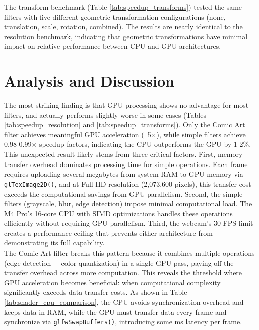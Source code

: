 \documentclass[12pt,a4paper]{article}
\begin{document}
The transform benchmark (Table \ref{tab:speedup_transforms}) tested the same filters with five different geometric transformation configurations (none, translation, scale, rotation, combined). The results are nearly identical to the resolution benchmark, indicating that geometric transformations have minimal impact on relative performance between CPU and GPU architectures.

\section{Analysis and Discussion}
The most striking finding is that GPU processing shows no advantage for most filters, and actually performs slightly worse in some cases (Tables \ref{tab:speedup_resolution} and \ref{tab:speedup_transforms}). Only the Comic Art filter achieves meaningful GPU acceleration (~5×), while simple filters achieve 0.98-0.99× speedup factors, indicating the CPU outperforms the GPU by 1-2\%.
\\
This unexpected result likely stems from three critical factors. First, memory transfer overhead dominates processing time for simple operations. Each frame requires uploading several megabytes from system RAM to GPU memory via \texttt{glTexImage2D()}, and at Full HD resolution (2,073,600 pixels), this transfer cost exceeds the computational savings from GPU parallelism. Second, the simple filters (grayscale, blur, edge detection) impose minimal computational load. The M4 Pro's 16-core CPU with SIMD optimizations handles these operations efficiently without requiring GPU parallelism. Third, the webcam's 30 FPS limit creates a performance ceiling that prevents either architecture from demonstrating its full capability.
\\
The Comic Art filter breaks this pattern because it combines multiple operations (edge detection + color quantization) in a single GPU pass, paying off the transfer overhead across more computation. This reveals the threshold where GPU acceleration becomes beneficial: when computational complexity significantly exceeds data transfer costs. As shown in Table \ref{tab:shader_cpu_comparison}, the CPU avoids synchronization overhead and keeps data in RAM, while the GPU must transfer data every frame and synchronize via \texttt{glfwSwapBuffers()}, introducing some ms latency per frame.
\end{document}
